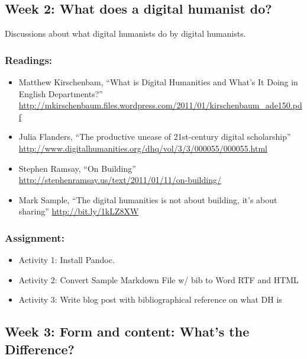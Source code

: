 \documentclass[]{article}
\begin{document}
\subsection{Week 2: What does a digital humanist
do?}\label{week-2-what-does-a-digital-humanist-do}

Discussions about what digital humanists do by digital humanists.

\subsubsection{Readings:}\label{readings-1}

\begin{itemize}
\itemsep1pt\parskip0pt
\item
  Matthew Kirschenbam, ``What is Digital Humanities and What's It Doing
  in English Departments?''
  \url{http://mkirschenbaum.files.wordpress.com/2011/01/kirschenbaum_ade150.pdf}
\item
  Julia Flanders, ``The productive unease of 21st-century digital
  scholarship''
  \url{http://www.digitalhumanities.org/dhq/vol/3/3/000055/000055.html}
\item
  Stephen Ramsay, ``On Building''
  \url{http://stephenramsay.us/text/2011/01/11/on-building/}
\item
  Mark Sample, ``The digital humanities is not about building, it's
  about sharing'' \url{http://bit.ly/1kLZ8XW}
\end{itemize}

\subsubsection{Assignment:}\label{assignment-1}

\begin{itemize}
\itemsep1pt\parskip0pt
\item
  Activity 1: Install Pandoc.
\item
  Activity 2: Convert Sample Markdown File w/ bib to Word RTF and HTML
\item
  Activity 3: Write blog post with bibliographical reference on what DH
  is
\end{itemize}

\subsection{Week 3: Form and content: What's the
Difference?}\label{week-3-form-and-content-whats-the-difference}
\end{document}
